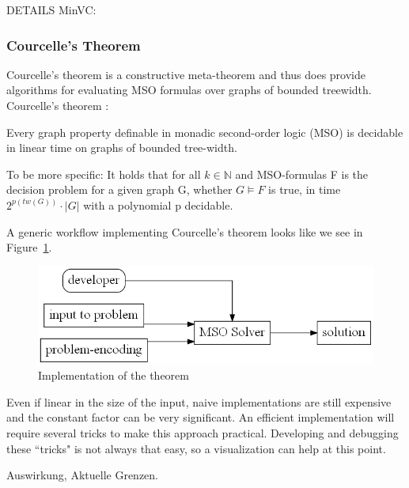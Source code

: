 \documentclass[a4paper, 12pt, bibliography=totoc]{scrartcl}
\begin{document}
DETAILS MinVC: 

\subsubsection{Courcelle's Theorem}
 Courcelle's theorem is a constructive meta-theorem and thus does provide algorithms for evaluating MSO formulas over graphs of bounded treewidth.
Courcelle's theorem \cite[p. 54]{Courcelle2012}:
\begin{thm}
	Every graph property definable in monadic second-order logic (MSO) is decidable in linear time on graphs of bounded tree-width. 

\end{thm}

\noindent
To be more specific: It holds that for all $k \in \mathbb{N}$ and MSO-formulas F is the decision problem for a given graph G, whether $G \models F$ is true, in time $2^{p(tw(G))} \cdot |G|$ with a polynomial p decidable.\smallskip 

\noindent
A generic workflow implementing Courcelle's theorem looks like we see in Figure~\ref{fig:UsageCourcelle}.
\begin{figure}[H]
	\includegraphics[height=0.2\textheight]{images/UsageCourcelle.gv.png}
	\caption{Implementation of the theorem}
	\label{fig:UsageCourcelle}
\end{figure}

Even if linear in the size of the input, naive implementations are still expensive and 
the constant factor can be very significant. An efficient implementation will require several tricks to make this approach practical. Developing and debugging these ``tricks" is not always that easy, so a visualization can help at this point.\smallskip 

Auswirkung, Aktuelle Grenzen.

\newpage
\end{document}
